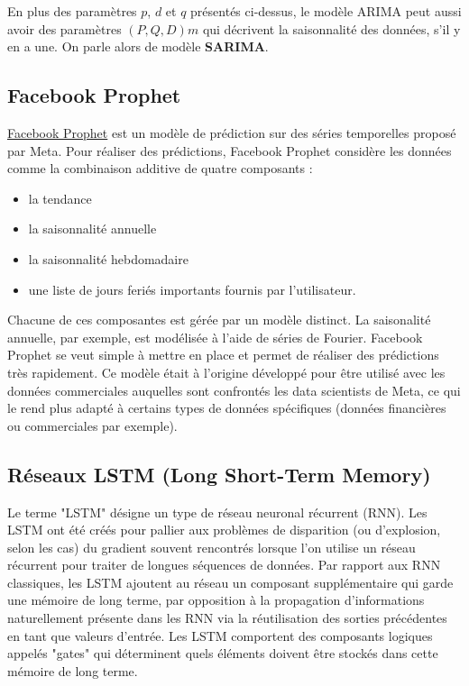 \documentclass[french]{article}
\begin{document}
    En plus des paramètres $p$, $d$ et $q$ présentés ci-dessus, le modèle ARIMA peut aussi avoir des paramètres $(P, Q, D)m$ qui décrivent la saisonnalité des données, s'il y en a une. On parle alors de modèle \textbf{SARIMA}.
    
    \subsection{Facebook Prophet}

    \href{https://facebook.github.io/prophet/}{Facebook Prophet} est un modèle de prédiction sur des séries temporelles proposé par Meta. 
    Pour réaliser des prédictions, Facebook Prophet considère les données comme la combinaison additive de quatre composants : 
    \begin{itemize}
        \item la tendance
        \item la saisonnalité annuelle
        \item la saisonnalité hebdomadaire
        \item une liste de jours feriés importants fournis par l'utilisateur.
    \end{itemize}
    Chacune de ces composantes est gérée par un modèle distinct. La saisonalité annuelle, par exemple, est modélisée à l'aide de séries de Fourier.
    Facebook Prophet se veut simple à mettre en place et permet de réaliser des prédictions très rapidement. Ce modèle était à l'origine développé pour être utilisé avec les données commerciales auquelles sont confrontés les data scientists de Meta, ce qui le rend plus adapté à certains types de données spécifiques (données financières ou commerciales par exemple). 
    
    \subsection{Réseaux LSTM (Long Short-Term Memory)}

    Le terme "LSTM" désigne un type de réseau neuronal récurrent (RNN). Les LSTM ont été créés pour pallier aux problèmes de disparition (ou d'explosion, selon les cas) du gradient souvent rencontrés lorsque l'on utilise un réseau récurrent pour traiter de longues séquences de données.
    Par rapport aux RNN classiques, les LSTM ajoutent au réseau un composant supplémentaire qui garde une mémoire de long terme, par opposition à la propagation d'informations naturellement présente dans les RNN via la réutilisation des sorties précédentes en tant que valeurs d'entrée. Les LSTM comportent des composants logiques appelés "gates" qui déterminent quels éléments doivent être stockés dans cette mémoire de long terme.
\end{document}
